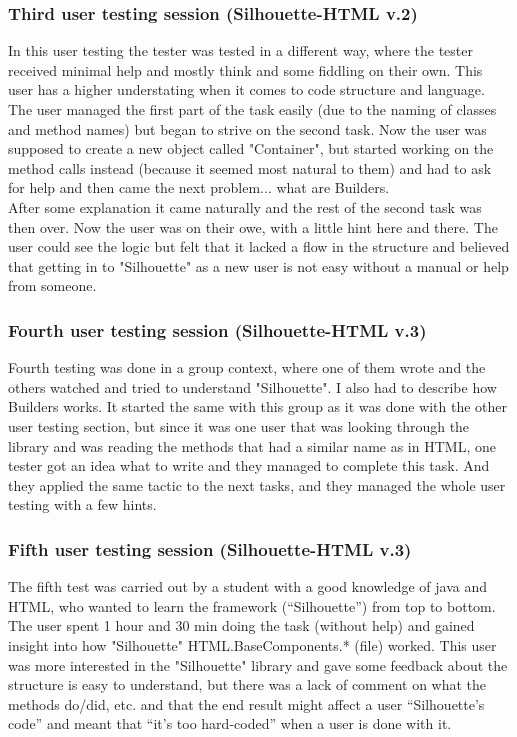 \documentclass[12pt]{article}
\begin{document}
        \subsubsection{Third user testing session (Silhouette-HTML v.2)}
        In this user testing the tester was tested in a different way, where the tester received minimal help and mostly think and some fiddling on their own. This user has a higher understating when it comes to code structure and language.\\ The user managed the first part of the task easily (due to the naming of classes and method names) but began to strive on the second task. Now the user was supposed to create a new object called "Container", but started working on the method calls instead (because it seemed most natural to them) and had to ask for help and then came the next problem... what are Builders.\\ After some explanation it came naturally and the rest of the second task was then over. Now the user was on their owe, with a little hint here and there. The user could see the logic but felt that it lacked a flow in the structure and believed that getting in to "Silhouette" as a new user is not easy without a manual or help from someone.
        
        \subsubsection{Fourth user testing session (Silhouette-HTML v.3)}
        Fourth testing was done in a group context, where one of them wrote and the others watched and tried to understand "Silhouette". I also had to describe how Builders works. 
        It started the same with this group as it was done with the other user testing section, but since it was one user that was looking through the library and was reading the methods that had a similar name as in HTML, one tester got an idea what to write and they managed to complete this task. And they applied the same tactic to the next tasks, and they managed the whole user testing with a few hints. 

        \subsubsection{Fifth user testing session (Silhouette-HTML v.3)}
        The fifth test was carried out by a student with a good knowledge of java and HTML, who wanted to learn the framework (“Silhouette”) from top to bottom. The user spent 1 hour and 30 min doing the task (without help) and gained insight into how "Silhouette" HTML.BaseComponents.* (file) worked. This user was more interested in the "Silhouette" library and gave some feedback about the structure is easy to understand, but there was a lack of comment on what the methods do/did, etc. and that the end result might affect a user “Silhouette’s code” and meant that “it’s too hard-coded” when a user is done with it.
\end{document}

